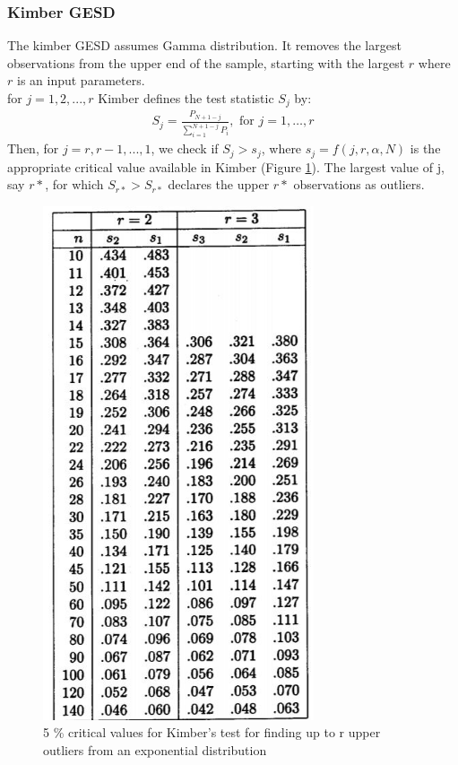 \subsubsection{Kimber GESD}
The kimber GESD \cite{kimber} \cite{kimber2} assumes Gamma distribution. It removes the largest observations from the upper end of the sample, starting
with the largest $r$ where $r$ is an input parameters.\\
 for $j = 1, 2, ... , r$ Kimber defines the test statistic $S_j$ by:\\
\begin{eqnarray}
S_j=\frac{P_{N+1-j}}{\sum_{i=1}^{N+1-j}P_i}, \text{ for $j= 1, \dots , r$}
\end{eqnarray}
Then, for $j = r, r- 1, ... , 1$, we check if $ S_j > s_j $, where $s_j=f(j,r,\alpha,N )$ is the appropriate critical value available in Kimber (Figure \ref{kimber}). The largest value of j, say $r*$, for which $S_{r*} > S_{r*}$ declares the upper $r*$ observations as outliers.

\begin{figure}\label{kimber}
	\centering
	\includegraphics[width=8cm]{kimber}
	\caption{5 \% critical values for Kimber's test for finding up to r upper outliers from
		an exponential distribution }
	
\end{figure}

